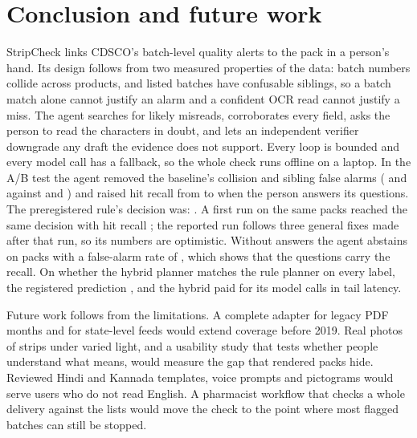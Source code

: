 \section{Conclusion and future work}
\label{sec:conclusion}

StripCheck links CDSCO's batch-level quality alerts to the pack in a person's hand. Its design follows from two measured properties of the data: batch numbers collide across products, and listed batches have confusable siblings, so a batch match alone cannot justify an alarm and a confident OCR read cannot justify a miss. The agent searches for likely misreads, corroborates every field, asks the person to read the characters in doubt, and lets an independent verifier downgrade any draft the evidence does not support. Every loop is bounded and every model call has a fallback, so the whole check runs offline on a laptop.
\ifresults
In the A/B test the agent removed the baseline's collision and sibling false alarms ( and  against  and ) and raised hit recall from  to  when the person answers its questions. The preregistered rule's decision was: . A first run on the same packs reached the same decision with hit recall \RunOneRulesOracleHitRecall; the reported run follows three general fixes made after that run, so its numbers are optimistic. Without answers the agent abstains on  packs with a false-alarm rate of , which shows that the questions carry the recall. On whether the hybrid planner matches the rule planner on every label, the registered prediction , and the hybrid paid for its model calls in tail latency.
\fi

Future work follows from the limitations. A complete adapter for legacy PDF months and for state-level feeds would extend coverage before 2019. Real photos of strips under varied light, and a usability study that tests whether people understand what \NLISTED{} means, would measure the gap that rendered packs hide. Reviewed Hindi and Kannada templates, voice prompts and pictograms would serve users who do not read English. A pharmacist workflow that checks a whole delivery against the lists would move the check to the point where most flagged batches can still be stopped.
